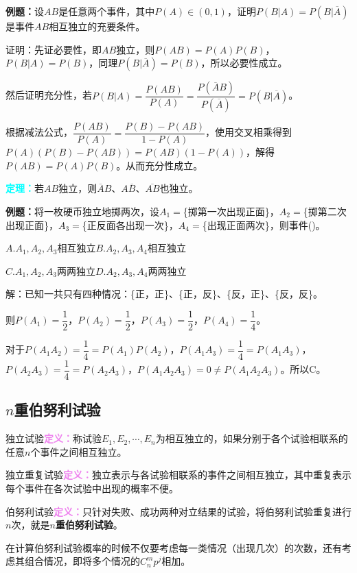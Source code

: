 \documentclass[UTF8, 12pt]{ctexart}
\begin{document}
\textbf{例题：}设$AB$是任意两个事件，其中$P(A)\in(0,1)$，证明$P(B|A)=P(B|\overline{A})$是事件$AB$相互独立的充要条件。

证明：先证必要性，即$AB$独立，则$P(AB)=P(A)P(B)$，$P(B|A)=P(B)$，同理$P(B|\overline{A})=P(B)$，所以必要性成立。

然后证明充分性，若$P(B|A)=\dfrac{P(AB)}{P(A)}=\dfrac{P(\overline{A}B)}{P(\overline{A})}=P(B|\overline{A})$。

根据减法公式，$\dfrac{P(AB)}{P(A)}=\dfrac{P(B)-P(AB)}{1-P(A)}$，使用交叉相乘得到$P(A)(P(B)-P(AB))=P(AB)(1-P(A))$，解得$P(AB)=P(A)P(B)$。从而充分性成立。

\textcolor{aqua}{\textbf{定理：}}若$AB$独立，则$\overline{A}B$、$A\overline{B}$、$\overline{AB}$也独立。

\textbf{例题：}将一枚硬币独立地掷两次，设$A_1=$\{掷第一次出现正面\}，$A_2=$\{掷第二次出现正面\}，$A_3=$\{正反面各出现一次\}，$A_4=$\{出现正面两次\}，则事件()。

$A.A_1,A_2,A_3$相互独立\qquad$B.A_2,A_3,A_4$相互独立

$C.A_1,A_2,A_3$两两独立\qquad$D.A_2,A_3,A_4$两两独立

解：已知一共只有四种情况：\{正，正\}、\{正，反\}、\{反，正\}、\{反，反\}。

则$P(A_1)=\dfrac{1}{2}$，$P(A_2)=\dfrac{1}{2}$，$P(A_3)=\dfrac{1}{2}$，$P(A_4)=\dfrac{1}{4}$。

对于$P(A_1A_2)=\dfrac{1}{4}=P(A_1)P(A_2)$，$P(A_1A_3)=\dfrac{1}{4}=P(A_1A_3)$，$P(A_2A_3)=\dfrac{1}{4}=P(A_2A_3)$，$P(A_1A_2A_3)=0\neq P(A_1A_2A_3)$。所以C。

\subsection{\texorpdfstring{$n$重伯努利试验}{}}

独立试验\textcolor{violet}{\textbf{定义：}}称试验$E_1,E_2,\cdots,E_n$为相互独立的，如果分别于各个试验相联系的任意$n$个事件之间相互独立。

独立重复试验\textcolor{violet}{\textbf{定义：}}独立表示与各试验相联系的事件之间相互独立，其中重复表示每个事件在各次试验中出现的概率不便。

伯努利试验\textcolor{violet}{\textbf{定义：}}只针对失败、成功两种对立结果的试验，将伯努利试验重复进行$n$次，就是\textbf{$n$重伯努利试验}。

在计算伯努利试验概率的时候不仅要考虑每一类情况（出现几次）的次数，还有考虑其组合情况，即将多个情况的$C_n^mp^j$相加。
\end{document}
